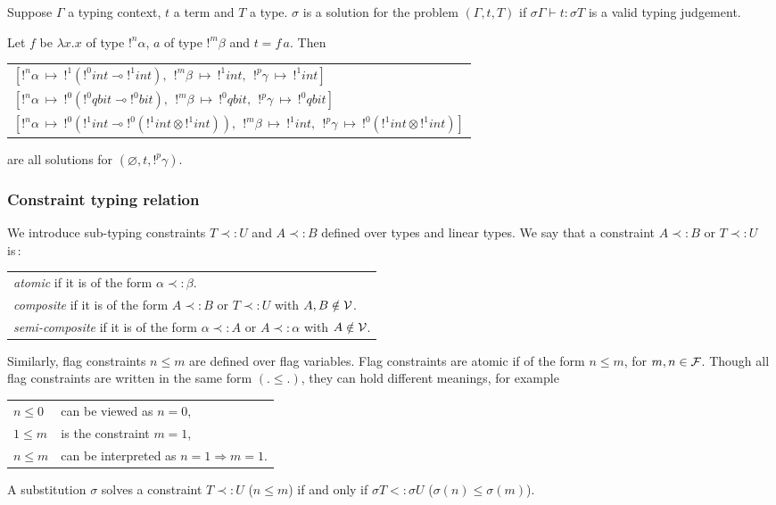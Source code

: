 \begin{defn}
	\label{decl_problem}
	Suppose $\Gamma$ a typing context, $t$ a term and $T$ a type. $\sigma$ is a solution for the problem $(\Gamma, t, T)$ if
	$\sigma \Gamma \vdash t : \sigma T$ is a valid typing judgement.
\end{defn}

\begin{exmp} Let $f$ be $\lambda x.x$ of type $!^n \alpha$, $a$ of type $!^m \beta$ and $t = f \, a$. Then
	\begin{center}
	\begin{tabular}{l}
		$[!^n\alpha ~\mapsto~ !^1(!^0int \multimap !^1int),~~ !^m\beta ~\mapsto~ !^1int,~~ !^p\gamma ~\mapsto~ !^1int]$ \\
		$[!^n\alpha ~\mapsto~ !^0(!^0qbit \multimap !^0bit),~~ !^m\beta ~\mapsto~ !^0qbit,~~ !^p\gamma ~\mapsto~ !^0qbit]$ \\
		$[!^n\alpha ~\mapsto~ !^0(!^1int \multimap !^0(!^1int \otimes !^1int)),
			~~ !^m\beta ~\mapsto~ !^1int,
			~~ !^p\gamma ~\mapsto~ !^0(!^1int \otimes !^1int)]$
	\end{tabular}
	\end{center}
	are all solutions for $(\varnothing, t, !^p \gamma)$.
\end{exmp}

\subsubsection{Constraint typing relation}

\begin{defn} We introduce sub-typing constraints $T \prec: U$ and $A \prec: B$ defined over types and linear types.
	We say that a constraint $A \prec: B$ or $T \prec: U$ is\,:
		\begin{center}
		\begin{tabular}{l}
			\textit{atomic} if it is of the form $\alpha \prec: \beta$. \\
			\textit{composite} if it is of the form $A \prec: B$ or $T \prec: U$ with $A, B \notin \mathcal{V}$. \\
			\textit{semi-composite} if it is of the form $\alpha \prec: A$ or $A \prec: \alpha$ with $A \notin \mathcal{V}$.
		\end{tabular}
		\end{center}
  Similarly, flag constraints $n \le m$ are defined over flag variables. Flag constraints are atomic if of the form $n \le m$,
  for $m, n\in \mathcal{F}$.
  Though all flag constraints are written in the same form $(. \le .)$, they can hold different meanings, for example
  	\begin{center}
  	\begin{tabular}{ll}
  		$n \le 0$ & can be viewed as $n = 0$, \\
  		$1 \le m$ & is the constraint $m = 1$, \\
  		$n \le m$ & can be interpreted as $n = 1 \Rightarrow m = 1$.
  	\end{tabular}
  	\end{center}
  A substitution $\sigma$ solves a constraint $T \prec: U$ ($n \le m$) if and only if $\sigma T <: \sigma U$ ($\sigma(n) \le \sigma(m)$).
\end{defn}


